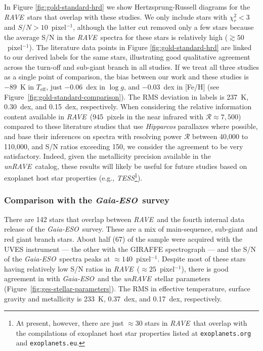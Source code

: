 \documentclass[preprint,trackchanges]{aastex}
\newcommand{\acronym}[1]{{\small{#1}}}
\newcommand{\project}[1]{\textsl{#1}}
\newcommand{\rave}{\project{\acronym{RAVE}}}
\newcommand{\ges}{\project{Gaia-ESO}}
\newcommand{\unrave}{\project{unRAVE}}
\newcommand{\teff}{T_{\mathrm{eff}}}
\newcommand{\logg}{\log g}
\begin{document}
In Figure \ref{fig:gold-standard-hrd} we show Hertzsprung-Russell diagrams 
for the \rave\ stars that overlap with these studies.  We only include stars 
with $\chi_r^2 < 3$ and $S/N > 10$~pixel$^{-1}$, although the latter cut 
removed only a few stars because the average S/N in the \rave\ spectra for
these stars is relatively high ($\gtrsim{}50$~pixel$^{-1}$).  The literature 
data points in Figure \ref{fig:gold-standard-hrd} are linked to our derived
labels for the same stars, illustrating good qualitative agreement across 
the turn-off and sub-giant branch in all studies.  If we treat all three 
studies as a single point of comparison, the bias between our work and these 
studies is $-89$~K in $\teff$, just $-0.06$~dex in $\logg$, and $-0.03$~dex 
in [Fe/H] (see Figure~\ref{fig:gold-standard-comparison}).  The RMS deviation
in labels is 237~K, 0.30~dex, and 0.15~dex, respectively.  When considering 
the relative information content available in \rave\ (945~pixels in the near 
infrared with $\mathcal{R} \approx 7{,}500$) compared to these literature 
studies that use \project{Hipparcos} parallaxes where possible, and base 
their inferences on spectra with resolving power $\mathcal{R}$ between 
40,000 to 110,000, and S/N ratios exceeding 150, we consider the agreement 
to be very satisfactory.  Indeed, given the metallicity precision available
in the \unrave\ catalog, these results will likely be useful for future 
studies based on exoplanet host star properties (e.g., 
\project{TESS}\footnote{At present, however, there are just $\approx$30 
stars in \rave\ that overlap with the compilations of exoplanet host star 
properties listed at \texttt{exoplanets.org} and \texttt{exoplanets.eu}.}).


\subsubsection{Comparison with the \ges\ survey}
\label{sec:validation-ges}


There are 142 stars that overlap between \rave\ and the fourth internal
data release of the \ges\ survey. These are a mix of main-sequence, 
sub-giant and red giant branch stars.  About half (67) of the sample 
were acquired with the \acronym{UVES} instrument --- the other with the 
\acronym{GIRAFFE} spectrograph --- and the S/N of the \ges\ spectra peaks 
at $\approx140$~pixel$^{-1}$.  Despite most of these stars having relatively 
low S/N ratios in \rave\ ($\approx 25$~pixel$^{-1}$), there is good agreement
in with \ges\ and the \unrave\ stellar parameters (Figure~\ref{fig:ges-stellar-parameters}).  
The RMS in effective temperature, surface gravity and metallicity is 233~K, 
0.37~dex, and 0.17~dex, respectively.  
\end{document}
